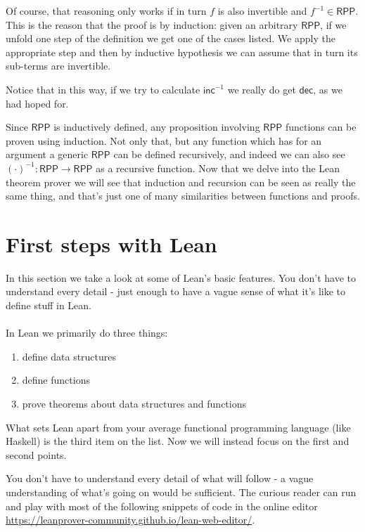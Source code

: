 \documentclass{book}
\theoremstyle{definition}
\theoremstyle{remark}
\theoremstyle{plain}
\newcommand{\RPP}{\mathsf{RPP}}
\newcommand{\rppinc}{\mathsf{inc}}
\newcommand{\rppdec}{\mathsf{dec}}
\begin{document}
Of course, that reasoning only works if in turn $f$ is also invertible and $f^{-1} \in \RPP$.
This is the reason that the proof is by induction:
given an arbitrary $\RPP$, if we unfold one step of the definition we get one of the cases listed.
We apply the appropriate step and then by inductive hypothesis we can assume that in turn its sub-terms are invertible.

Notice that in this way, if we try to calculate $\rppinc^{-1}$ we really do get $\rppdec$, as we had hoped for.

Since $\RPP$ is inductively defined, any proposition involving $\RPP$ functions can be proven using induction.
Not only that, but any function which has for an argument a generic $\RPP$ can be defined recursively,
and indeed we can also see $(\cdot)^{-1}:\RPP \to \RPP$ as a recursive function.
Now that we delve into the Lean theorem prover we will see that induction and recursion can be seen as really the same thing,
and that's just one of many similarities between functions and proofs.

\section{First steps with Lean}

In this section we take a look at some of Lean's basic features.
You don't have to understand every detail -
just enough to have a vague sense of what it's like to define stuff in Lean.

\paragraph{}

In Lean we primarily do three things:
\begin{enumerate}
\item define data structures
\item define functions
\item prove theorems about data structures and functions
\end{enumerate}
What sets Lean apart from your average functional programming language (like Haskell) is the third item on the list.
Now we will instead focus on the first and second points.

You don't have to understand every detail of what will follow -
a vague understanding of what's going on would be sufficient.
The curious reader can run and play with most of the following snippets of code
in the online editor \url{https://leanprover-community.github.io/lean-web-editor/}.
\end{document}
